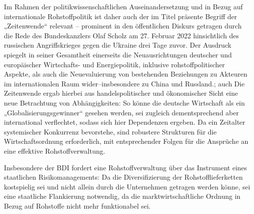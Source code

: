 \documentclass[12pt,a4paper,oneside]{book} %
\begin{document}
	Im Rahmen der politikwissenschaftlichen Auseinandersetzung und in Bezug auf internationale Rohstoffpolitik ist daher auch der im Titel präsente Begriff der „Zeitenwende“ relevant – prominent in den öffentlichen Diskurs getragen durch die Rede des Bundeskanzlers Olaf Scholz am 27. Februar 2022 hinsichtlich des russischen Angriffskrieges gegen die Ukraine drei Tage zuvor.\autocite{deutsche_bundesregierung_reden_2022} Der Ausdruck spiegelt in seiner Gesamtheit einerseits die Neuausrichtungen deutscher und europäischer Wirtschafts- und Energiepolitik, inklusive rohstoffpolitischer Aspekte, als auch die Neuevaluierung von bestehenden Beziehungen zu Akteuren im internationalen Raum wider--insbesondere zu China und Russland.\autocite[siehe auch][Rn. 741-746]{moser_zeitenwende_2022}; auch \autocite{[695-701]schaffer_ausenwirtschaftsrecht_2023} Die Zeitenwende ergab hierbei aus handelspolitischer und ökonomischer Sicht eine neue Betrachtung von Abhängigkeiten: So könne die deutsche Wirtschaft als ein „Globalisierungsgewinner“ gesehen werden, sei zugleich dementsprechend aber international verflechtet, sodass sich hier Dependenzen ergeben.\autocite{machnig_zeitenwende_2023} Da ein Zeitalter systemischer Konkurrenz bevorstehe, sind robustere Strukturen für die Wirtschaftsordnung erforderlich,\autocite{europaische_kommission_globale_2015} mit entsprechender Folgen für die Ansprüche an eine effektive Rohstoffverwaltung.
	
	Insbesondere der BDI fordert eine Rohstoffverwaltung über das Instrument eines staatlichen Risikomanagements: Da die Diversifizierung der Rohstofflieferketten kostspielig sei und nicht allein durch die Unternehmen getragen werden könne, sei eine staatliche Flankierung notwendig, da die marktwirtschaftliche Ordnung in Bezug auf Rohstoffe nicht mehr funktionabel sei.\autocite{Stefan Steinicke, BDI, 06.05.2025}
\end{document}
